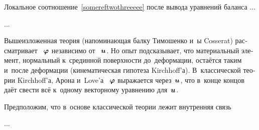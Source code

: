 

\begin{otherlanguage}{russian}

Локальное соотношение~\eqref{somereftwothreeeee} после вывода уравнений баланса ...

...



\end{otherlanguage}



\begin{otherlanguage}{russian}

Вышеизложенная теория
(напоминающая балку Тимошенко
и~\rucontinuum{}ы Cosserat)
рассматривает
~$\bm{\varphi}$
независимо от ~$\bm{u}$.
Но опыт подсказывает, что
материальный элемент,
нормальный к~срединной поверхности до~деформации,
остаётся таким
и~после деформации
(кинематическая гипотеза Kirchhoff’а).
В~классической теории Kirchhoff’а,
Арона и~Love’а
~$\bm{\varphi}$
выражается через~$\bm{u}$,
что в~конце концов
даёт свести всё
к~одному векторному уравнению
для~$\bm{u}$.

Предположим,
что в~основе классической теории
лежит
внутренняя связь

...


\end{otherlanguage}



